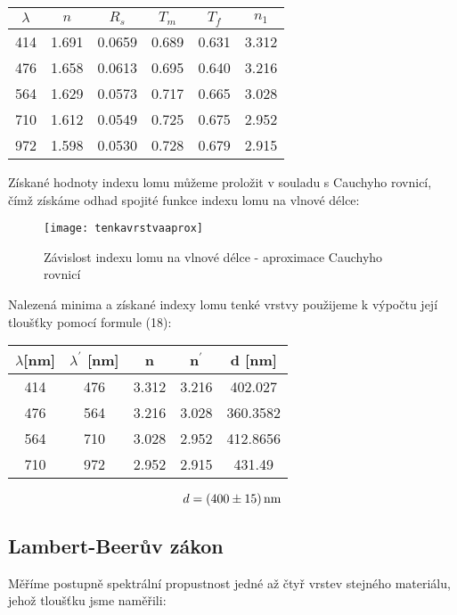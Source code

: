 \documentclass[czech,11pt,a4paper]{article}
\begin{document}
\begin{multicols}{2}
\begin{center}
		\begin{tabular}{|c|c|c|c|c|c|}
		\hline
		$\lambda$ & $n$      & $R_s$    & $T_m$    & $T_f$    & $n_1$  \\ \hline
		414       & 1.691 & 0.0659 & 0.689 & 0.631 & 3.312 \\ \hline
		476       & 1.658 & 0.0613 & 0.695 & 0.640 & 3.216 \\ \hline
		564       & 1.629 & 0.0573 & 0.717 & 0.665 & 3.028 \\ \hline
		710       & 1.612 & 0.0549 & 0.725 & 0.675 & 2.952 \\ \hline
		972       & 1.598 & 0.0530 & 0.728 & 0.679 & 2.915 \\ \hline
	\end{tabular}
\end{center}
	Získané hodnoty indexu lomu můžeme proložit v souladu s Cauchyho rovnicí, čímž získáme odhad spojité funkce indexu lomu na vlnové délce:
		\begin{figure}[H]
\begin{center}
		\texttt{[image: tenkavrstvaaprox]}
	\caption{Závislost indexu lomu na vlnové délce - aproximace Cauchyho rovnicí}
\end{center}
		\end{figure}
		
		Nalezená minima a získané indexy lomu tenké vrstvy použijeme k výpočtu její tloušťky pomocí formule (18):
		\begin{center}
			\begin{tabular}{|c|c|c|c|c|}
			\hline
			$\lambda $[nm] & $\lambda^\prime$ [nm] & n     & n$^\prime$    & d [nm]   \\ \hline
			414            & 476                   & 3.312 & 3.216 & 402.027  \\ \hline
			476            & 564                   & 3.216 & 3.028 & 360.3582 \\ \hline
			564            & 710                   & 3.028 & 2.952 & 412.8656 \\ \hline
			710            & 972                   & 2.952 & 2.915 & 431.49   \\ \hline
		\end{tabular}
		\end{center}
		\begin{equation*}
			d = (400 \pm 15) \,\rm nm
		\end{equation*}
		\subsection{Lambert-Beerův zákon}
		Měříme postupně spektrální propustnost jedné až čtyř vrstev stejného materiálu, jehož tloušťku jsme naměřili:
		

\end{multicols}
\end{document}
